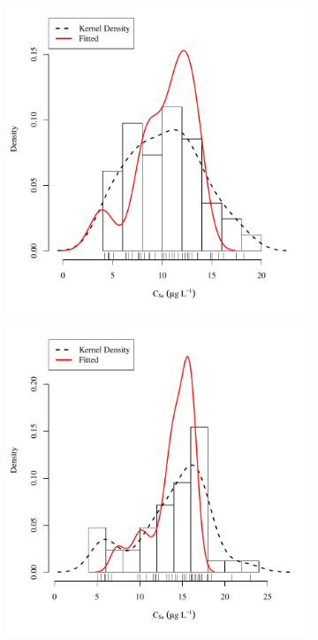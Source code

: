 \subfiguretop
\begin{landscape}
	\begin{figure}
		\begin{subfigure}{0.7\textwidth}
			\centering
			\includegraphics[width=\tableCustomSize]{"Figures/Results_DSR/Stochastic/Conc Model ResDist D101C"}
		\end{subfigure}%
		\begin{subfigure}{0.7\textwidth}
			\centering
			\includegraphics[width=\tableCustomSize]{"Figures/Results_DSR/Stochastic/Conc Model ResDist D106C"}

\end{subfigure}
\end{figure}
\end{landscape}
